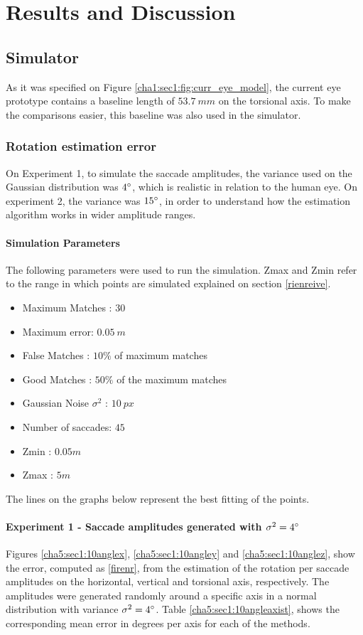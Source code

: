 
\chapter{Results and Discussion}
\label{cha4:results}

\section{Simulator}
As it was specified on Figure \ref{cha1:sec1:fig:curr_eye_model}, the current eye prototype contains a baseline length of $53.7 \ mm$ on the torsional axis. To make the comparisons easier, this baseline was also used in the simulator.
\subsection{Rotation estimation error}
\label{reiovniorevn}
On Experiment 1, to simulate the saccade amplitudes, the variance used on the Gaussian distribution was $4 \degree$, which is realistic in relation to the human eye. On experiment 2, the variance was $15 \degree$, in order to understand how the estimation algorithm works in wider amplitude ranges.
\subsubsection{Simulation Parameters}
The following parameters were used to run the simulation. Zmax and Zmin refer to the range in which points are simulated explained on section \ref{rienreive}.
\begin{itemize}
	\item Maximum Matches : $30$
	\item Maximum error: $0.05 \ m$
	\item False Matches : $10 \%$ of maximum matches
	\item Good Matches : $50 \%$ of the maximum matches
	\item Gaussian Noise $\sigma^2$ : $10 \ px$
	\item Number of saccades: $45$
	\item Zmin : $0.05 m$
	\item Zmax : $5 m$
\end{itemize}
The lines on the graphs below represent the best fitting of the points.
\subsubsection{Experiment 1 - Saccade amplitudes generated with $\sigma^2 = 4 \degree $}
Figures \ref{cha5:sec1:10anglex}, \ref{cha5:sec1:10angley} and \ref{cha5:sec1:10anglez}, show the error, computed as \ref{firenr}, from the estimation of the rotation per saccade amplitudes on the horizontal, vertical and torsional axis, respectively. The amplitudes were generated randomly around a specific axis in a normal distribution with variance $\sigma^2 = 4 \degree$. Table \ref{cha5:sec1:10angleaxist}, shows the corresponding mean error in degrees per axis for each of the methods.\\


